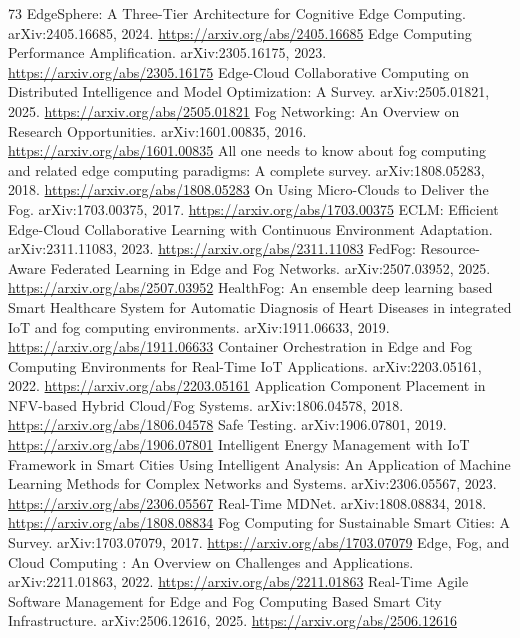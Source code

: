 \documentclass[11pt]{article}
\begin{document}
\begin{thebibliography}{73}
 EdgeSphere: A Three-Tier Architecture for Cognitive Edge Computing. arXiv:2405.16685, 2024. \url{https://arxiv.org/abs/2405.16685}
 Edge Computing Performance Amplification. arXiv:2305.16175, 2023. \url{https://arxiv.org/abs/2305.16175}
 Edge-Cloud Collaborative Computing on Distributed Intelligence and Model Optimization: A Survey. arXiv:2505.01821, 2025. \url{https://arxiv.org/abs/2505.01821}
 Fog Networking: An Overview on Research Opportunities. arXiv:1601.00835, 2016. \url{https://arxiv.org/abs/1601.00835}
 All one needs to know about fog computing and related edge computing paradigms: A complete survey. arXiv:1808.05283, 2018. \url{https://arxiv.org/abs/1808.05283}
 On Using Micro-Clouds to Deliver the Fog. arXiv:1703.00375, 2017. \url{https://arxiv.org/abs/1703.00375}
 ECLM: Efficient Edge-Cloud Collaborative Learning with Continuous Environment Adaptation. arXiv:2311.11083, 2023. \url{https://arxiv.org/abs/2311.11083}
 FedFog: Resource-Aware Federated Learning in Edge and Fog Networks. arXiv:2507.03952, 2025. \url{https://arxiv.org/abs/2507.03952}
 HealthFog: An ensemble deep learning based Smart Healthcare System for Automatic Diagnosis of Heart Diseases in integrated IoT and fog computing environments. arXiv:1911.06633, 2019. \url{https://arxiv.org/abs/1911.06633}
 Container Orchestration in Edge and Fog Computing Environments for Real-Time IoT Applications. arXiv:2203.05161, 2022. \url{https://arxiv.org/abs/2203.05161}
 Application Component Placement in NFV-based Hybrid Cloud/Fog Systems. arXiv:1806.04578, 2018. \url{https://arxiv.org/abs/1806.04578}
 Safe Testing. arXiv:1906.07801, 2019. \url{https://arxiv.org/abs/1906.07801}
 Intelligent Energy Management with IoT Framework in Smart Cities Using Intelligent Analysis: An Application of Machine Learning Methods for Complex Networks and Systems. arXiv:2306.05567, 2023. \url{https://arxiv.org/abs/2306.05567}
 Real-Time MDNet. arXiv:1808.08834, 2018. \url{https://arxiv.org/abs/1808.08834}
 Fog Computing for Sustainable Smart Cities: A Survey. arXiv:1703.07079, 2017. \url{https://arxiv.org/abs/1703.07079}
 Edge, Fog, and Cloud Computing : An Overview on Challenges and Applications. arXiv:2211.01863, 2022. \url{https://arxiv.org/abs/2211.01863}
 Real-Time Agile Software Management for Edge and Fog Computing Based Smart City Infrastructure. arXiv:2506.12616, 2025. \url{https://arxiv.org/abs/2506.12616}

\end{thebibliography}
\end{document}
